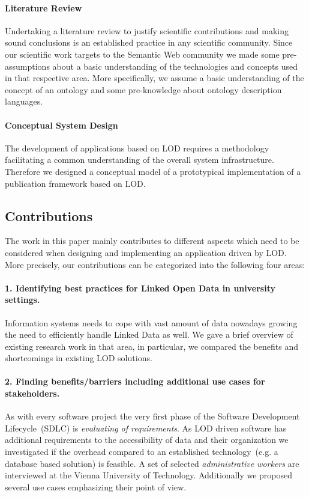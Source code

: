 \documentclass{article}
\begin{document}
\paragraph{Literature Review}
Undertaking a literature review to justify scientific contributions and making sound conclusions is an established practice in any scientific community. Since our scientific work targets to the Semantic Web community we made some pre-assumptions about a basic understanding of the technologies and concepts used in that respective area. More specifically, we assume a basic understanding of the concept of an ontology and some pre-knowledge about ontology description languages. 
\paragraph{Conceptual System Design}
The development of applications based on LOD requires a methodology facilitating a common understanding of the overall system infrastructure. Therefore we designed a conceptual model of a prototypical implementation of a publication framework based on LOD. 

\subsection{Contributions}
The work in this paper mainly contributes to different aspects which need to be considered when designing and implementing an application driven by LOD.
More precisely, our contributions can be categorized into the following four areas:
\paragraph{1. Identifying best practices for Linked Open Data in university settings.}
Information systems needs to cope with vast amount of data nowadays growing the need to efficiently handle Linked Data as well. We gave a brief overview of existing research work in that area, in particular, we compared the benefits and shortcomings in existing LOD solutions. 
\paragraph{2. Finding benefits/barriers including additional use cases for stakeholders.}
As with every software project the very first phase of the Software Development Lifecycle~(SDLC) is \textit{evaluating of requirements}. As LOD driven software has additional requirements to the accessibility of data and their organization we investigated if the overhead compared to an established technology~(e.g. a database based solution) is feasible. A set of selected \textit{administrative workers} are interviewed at the Vienna University of Technology. Additionally we proposed several use cases emphasizing their point of view. 
\end{document}
